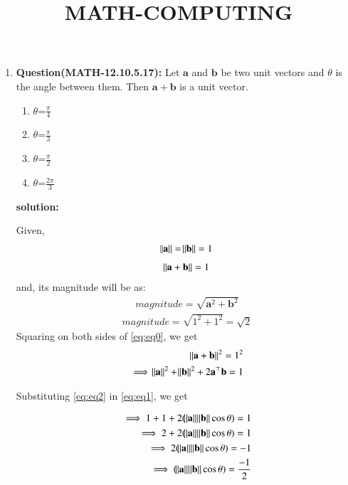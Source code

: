 \documentclass[12pt,-letter paper]{article}
\let\vec\mathbf{}
\let\vec\mathbf{}
\let\vec\mathbf{}
\begin{document}
\title{\textbf{MATH-COMPUTING}}
\maketitle
\begin{enumerate}
 
    \item \textbf{Question(MATH-12.10.5.17):}
       Let $\vec{a}$ and $\vec{b}$ be two unit vectors and $\theta$ is the angle between them. Then $\vec{a}+\vec{b}$ is a unit vector.
    
 \begin{enumerate}[label=(\Alph*)]                     
 \item $\theta$=$\frac{\pi}{4}$
 \item $\theta$=$\frac{\pi}{3}$
  \item $\theta$=$\frac{\pi}{2}$
   \item $\theta$=$\frac{2\pi}{3}$
	    \end{enumerate}

 \textbf{solution:}

Given,
\begin{align}
	\norm{\vec{a}} = \norm{\vec{b}}=1 
 \label{eq:eq1}
  \end{align}
 \begin{align}
	\norm{\vec{a}+\vec{b}}=1
 \label{eq:eq0}
 \end{align}
  and, its magnitude will be as:
 \begin{align}
magnitude=\sqrt{\vec{a}^2+\vec{b}^2}
 \end{align}
\begin{align}
magnitude =\sqrt{1^2+1^2}=\sqrt{2}
 \end{align}
Squaring on both sides of \eqref{eq:eq0}, we get
\begin{align}
	\norm{\vec{a}+\vec{b}}^2=1^2
\\	
	\implies \norm{\vec{a}}^2 + \norm{\vec{b}}^2 + 2\vec{a}^{\top}\vec{b} = 1
 \label{eq:eq2}
\end{align}

Substituting \eqref{eq:eq2} in \eqref{eq:eq1}, we get

\begin{align}
	\implies 1+1+2(\norm{\vec{a}}\norm{\vec{b}}\cos{\theta})=1
	\\
	\implies 2+2(\norm{\vec{a}}\norm{\vec{b}}\cos{\theta})=1
        \\
	\implies 2(\norm{\vec{a}}\norm{\vec{b}}\cos{\theta})=-1
	\\
	\implies (\norm{\vec{a}}\norm{\vec{b}}\cos{\theta})=\frac{-1}{2}
 \label{eq:eq3}
\end{align}


\end{enumerate}
\end{document}

